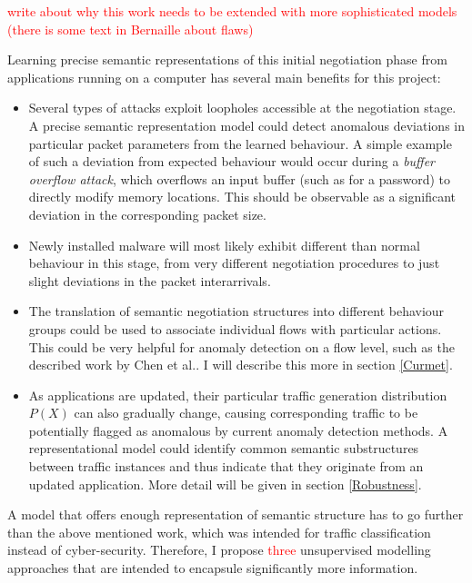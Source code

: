 \documentclass[a4paper,12pt,twoside]{report}
\begin{document}
 \textcolor{red}{write about why this work needs to be extended with more sophisticated models (there is some text in Bernaille about flaws)}



Learning precise semantic representations of this initial negotiation phase from applications running on a computer has several main benefits for this project: 

\begin{itemize}
\item Several types of attacks exploit loopholes accessible at the negotiation stage. A precise semantic representation model could detect anomalous deviations in particular packet parameters from the learned behaviour. A simple example of such a deviation from expected behaviour would occur during a \textit{buffer overflow attack}, which overflows an input buffer (such as for a password) to directly modify memory locations. This should be observable as a significant deviation in the corresponding packet size.

\item Newly installed malware will most likely exhibit different than normal behaviour in this stage, from very different negotiation procedures to just slight deviations in the packet interarrivals.

\item The translation of semantic negotiation structures into different behaviour groups could be used to associate individual flows with particular actions. This could be very helpful for anomaly detection on a flow level, such as the described work by Chen et al.\cite{chen_more_2016}. I will describe this more in section \ref{Curmet}.

\item As applications are updated, their particular traffic generation distribution $P(X)$ can also  gradually change, causing corresponding traffic to be potentially flagged as anomalous by current anomaly detection methods. A representational model could identify common semantic substructures between traffic instances and thus indicate that they originate from an updated application. More detail will be given in section \ref{Robustness}.

\end{itemize}


A model that offers enough representation of semantic structure has to go further than the above mentioned work, which was intended for traffic classification instead of cyber-security. Therefore, I propose \textcolor{red}{three} unsupervised modelling approaches that are intended to encapsule significantly more information.
\end{document}
